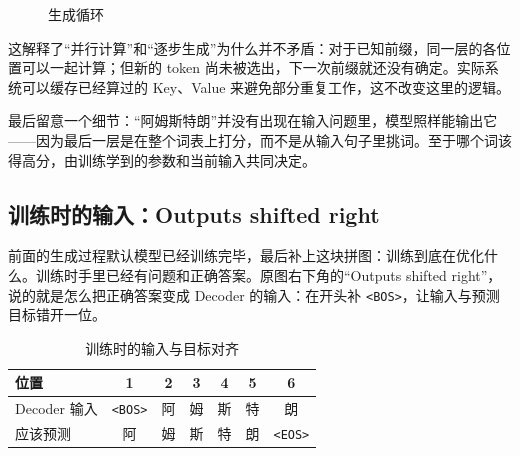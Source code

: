 \documentclass[UTF8,a4paper,12pt]{ctexart}
\numberwithin{equation}{section}
\newcommand{\bos}{\texttt{<BOS>}}
\newcommand{\eos}{\texttt{<EOS>}}
\begin{document}
\begin{figure}[htbp]
\centering
{}
\caption{生成循环}
\label{fig:generationloop}
\end{figure}

这解释了``并行计算''和``逐步生成''为什么并不矛盾：对于已知前缀，同一层的各位置可以一起计算；但新的 token 尚未被选出，下一次前缀就还没有确定。实际系统可以缓存已经算过的 Key、Value 来避免部分重复工作，这不改变这里的逻辑。

最后留意一个细节：``阿姆斯特朗''并没有出现在输入问题里，模型照样能输出它——因为最后一层是在整个词表上打分，而不是从输入句子里挑词。至于哪个词该得高分，由训练学到的参数和当前输入共同决定。

\subsection{训练时的输入：Outputs shifted right}

前面的生成过程默认模型已经训练完毕，最后补上这块拼图：训练到底在优化什么。训练时手里已经有问题和正确答案。原图右下角的``Outputs shifted right''，说的就是怎么把正确答案变成 Decoder 的输入：在开头补 \bos，让输入与预测目标错开一位。

\begin{table}[htbp]
\centering
\caption{训练时的输入与目标对齐}
\label{tab:teacherforcing}
\small\renewcommand{\arraystretch}{1.3}
\begin{tabular}{lcccccc}
\toprule
位置 & 1 & 2 & 3 & 4 & 5 & 6\\
\midrule
Decoder 输入 & \bos & 阿 & 姆 & 斯 & 特 & 朗\\
应该预测 & 阿 & 姆 & 斯 & 特 & 朗 & \eos\\
\bottomrule
\end{tabular}
\end{table}
\end{document}
